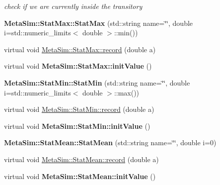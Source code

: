 \begin{DoxyCompactItemize}
\begin{DoxyCompactList}\small\item\em check if we are currently inside the transitory \end{DoxyCompactList}\item 
{\bfseries Meta\+Sim\+::\+Stat\+Max\+::\+Stat\+Max} (std\+::string name=\char`\"{}\char`\"{}, double i=std\+::numeric\+\_\+limits$<$ double $>$\+::min())\hypertarget{group__metasim__stat_ga14f427f356a519b0cb062f04121a459c}{}\label{group__metasim__stat_ga14f427f356a519b0cb062f04121a459c}

\item 
virtual void \hyperlink{group__metasim__stat_ga6dfddcc795d8681dd33bef7eb4debd8b}{Meta\+Sim\+::\+Stat\+Max\+::record} (double a)
\item 
virtual void {\bfseries Meta\+Sim\+::\+Stat\+Max\+::init\+Value} ()\hypertarget{group__metasim__stat_gadbda410e6ad06693ded410a3b018efc8}{}\label{group__metasim__stat_gadbda410e6ad06693ded410a3b018efc8}

\item 
{\bfseries Meta\+Sim\+::\+Stat\+Min\+::\+Stat\+Min} (std\+::string name=\char`\"{}\char`\"{}, double i=std\+::numeric\+\_\+limits$<$ double $>$\+::max())\hypertarget{group__metasim__stat_ga2575b20f42b10962a26a4bb5451fd33b}{}\label{group__metasim__stat_ga2575b20f42b10962a26a4bb5451fd33b}

\item 
virtual void \hyperlink{group__metasim__stat_ga420e16228992c9fb54a7a3264e4f87f5}{Meta\+Sim\+::\+Stat\+Min\+::record} (double a)
\item 
virtual void {\bfseries Meta\+Sim\+::\+Stat\+Min\+::init\+Value} ()\hypertarget{group__metasim__stat_gaef06e8556f9ab5802fc3fe99b05a2b29}{}\label{group__metasim__stat_gaef06e8556f9ab5802fc3fe99b05a2b29}

\item 
{\bfseries Meta\+Sim\+::\+Stat\+Mean\+::\+Stat\+Mean} (std\+::string name=\char`\"{}\char`\"{}, double i=0)\hypertarget{group__metasim__stat_ga6614e75e91e5f8b85153ecb24c3fbb40}{}\label{group__metasim__stat_ga6614e75e91e5f8b85153ecb24c3fbb40}

\item 
virtual void \hyperlink{group__metasim__stat_ga7acbee135dc23bc73135594b3bb03476}{Meta\+Sim\+::\+Stat\+Mean\+::record} (double a)
\item 
virtual void {\bfseries Meta\+Sim\+::\+Stat\+Mean\+::init\+Value} ()\hypertarget{group__metasim__stat_gaa47362e5a359e25d5358d840d2392b46}{}\label{group__metasim__stat_gaa47362e5a359e25d5358d840d2392b46}


\end{DoxyCompactItemize}
